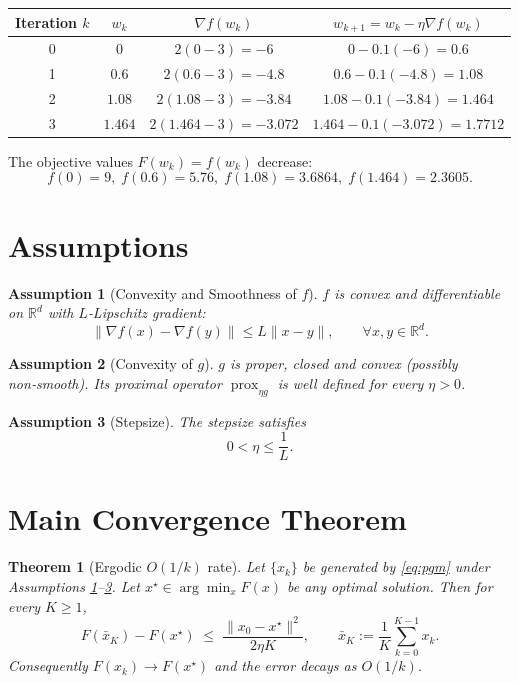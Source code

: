 \documentclass[11pt]{article}
\newtheorem{theorem}{Theorem}
\newtheorem{assumption}{Assumption}
\newcommand{\prox}{\operatorname{prox}}
\newcommand{\R}{\mathbb{R}}
\begin{document}
\begin{center}
\begin{tabular}{c|c|c|c}
Iteration $k$ & $w_{k}$ & $\nabla f(w_{k})$ & $w_{k+1}=w_{k}-\eta\nabla f(w_{k})$ \\ \hline
0 & $0$ & $2(0-3)=-6$ & $0-0.1(-6)=0.6$ \\
1 & $0.6$ & $2(0.6-3)=-4.8$ & $0.6-0.1(-4.8)=1.08$ \\
2 & $1.08$ & $2(1.08-3)=-3.84$ & $1.08-0.1(-3.84)=1.464$ \\
3 & $1.464$ & $2(1.464-3)=-3.072$ & $1.464-0.1(-3.072)=1.7712$
\end{tabular}
\end{center}
The objective values $F(w_{k})=f(w_{k})$ decrease:
\[
f(0)=9,\; f(0.6)=5.76,\; f(1.08)=3.6864,\; f(1.464)=2.3605.
\]

\newpage
\section*{Assumptions}
\begin{assumption}[Convexity and Smoothness of $f$]\label{ass:f}
$f$ is convex and differentiable on $\R^{d}$ with $L$‑Lipschitz gradient:
\[
\|\nabla f(x)-\nabla f(y)\|\le L\|x-y\|,\qquad\forall x,y\in\R^{d}.
\]
\end{assumption}

\begin{assumption}[Convexity of $g$]\label{ass:g}
$g$ is proper, closed and convex (possibly non‑smooth). Its proximal operator
$\prox_{\eta g}$ is well defined for every $\eta>0$.
\end{assumption}

\begin{assumption}[Stepsize]\label{ass:step}
The stepsize satisfies
\[
0<\eta\le\frac{1}{L}.
\]
\end{assumption}

\section*{Main Convergence Theorem}
\begin{theorem}[Ergodic $O(1/k)$ rate]\label{thm:rate}
Let $\{x_{k}\}$ be generated by \eqref{eq:pgm} under Assumptions \ref{ass:f}–\ref{ass:step}.
Let $x^{\star}\in\arg\min_{x}F(x)$ be any optimal solution.
Then for every $K\ge1$,
\[
\boxed{
F\!\left(\bar{x}_{K}\right)-F(x^{\star})
\;\le\;
\frac{\|x_{0}-x^{\star}\|^{2}}{2\eta K}},
\qquad
\bar{x}_{K}:=\frac{1}{K}\sum_{k=0}^{K-1}x_{k}.
\]
Consequently $F(x_{k})\to F(x^{\star})$ and the error decays as $O(1/k)$.
\end{theorem}
\end{document}
